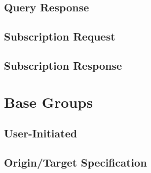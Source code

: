 \subsection*{Query Response}



\subsection*{Subscription Request}



\subsection*{Subscription Response}



\section{Base Groups}
\label{sec:Nachrichten:Basisgruppen}

\subsection*{User-Initiated}





\subsection*{Origin/Target Specification}




